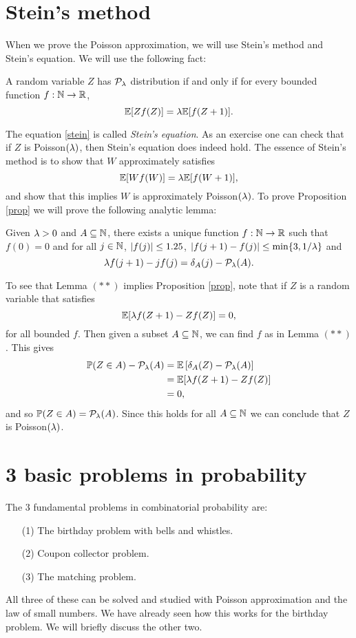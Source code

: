 \section{Stein's method}
When we prove the Poisson approximation, we will use Stein's method and Stein's equation. We will use the following fact:
\begin{prop}\label{prop}
    A random variable $Z$ has ${\mathcal{P}}_\lambda$ distribution if and only if for every bounded function $f:{{\mathbb N}} \to {\mathbb R}$, 
    \begin{equation}
        \label{stein} {\mathbb{E}}[Zf(Z)] = \lambda {\mathbb{E}}[f(Z+1)].
    \end{equation}
\end{prop}
The equation \eqref{stein} is called \emph{Stein's equation}. As an exercise one can check that if $Z$ is Poisson$(\lambda)$, then Stein's equation does indeed hold. The essence of Stein's method is to show that $W$ approximately satisfies 
\[{\mathbb{E}}[Wf(W)]  = \lambda {\mathbb{E}}[f(W+1)],\]
and show that this implies $W$ is approximately Poisson$(\lambda)$. To prove Proposition \ref{prop} we will prove the following analytic lemma:
\begin{lemma}[$**$]
    Given $\lambda > 0$ and $A \subseteq {{\mathbb N}}$, there exists a unique function $f: {{\mathbb N}} \to {\mathbb R}$ such that $f(0)=0$ and for all $j \in {{\mathbb N}}$, ${\left\lvert f(j)\right\rvert}\le 1.25$, ${\left\lvert f(j+1)-f(j)\right\rvert} \le \min\{3,1/\lambda\}$ and
    \[\lambda f(j+1)-jf(j) = \delta_A(j)-{\mathcal{P}}_\lambda(A).\]
\end{lemma}
To see that Lemma $(**)$ implies Proposition \ref{prop}, note that if $Z$ is a random variable that satisfies 
\[{\mathbb{E}}[\lambda f(Z+1)-Zf(Z)] = 0, \]
for all bounded $f$. Then given a subset $A \subseteq {{\mathbb N}}$, we can find $f$ as in Lemma $(**)$. This gives
\begin{align*}
    {\mathbb{P}}(Z \in A) - {\mathcal{P}}_\lambda(A) &= {\mathbb{E}}\left[\delta_A(Z)-{\mathcal{P}}_\lambda(A)\right]\\
    &= {\mathbb{E}}[\lambda f(Z+1)-Zf(Z)]\\
    &=0,
\end{align*}
and so ${\mathbb{P}}(Z \in A) = {\mathcal{P}}_\lambda(A)$. Since this holds for all $A \subseteq {{\mathbb N}}$ we can conclude that $Z$ is Poisson$(\lambda)$.
\section{3 basic problems in probability}
The 3 fundamental problems in combinatorial probability are:
\begin{enumerate}
    \item[(1)]  The birthday problem with bells and whistles.
    \item[(2)] Coupon collector problem.
    \item[(3)]  The matching problem.
\end{enumerate}
All three of these can be solved and studied with Poisson approximation and the law of small numbers. We have already seen how this works for the birthday problem. We will briefly discuss the other two.
